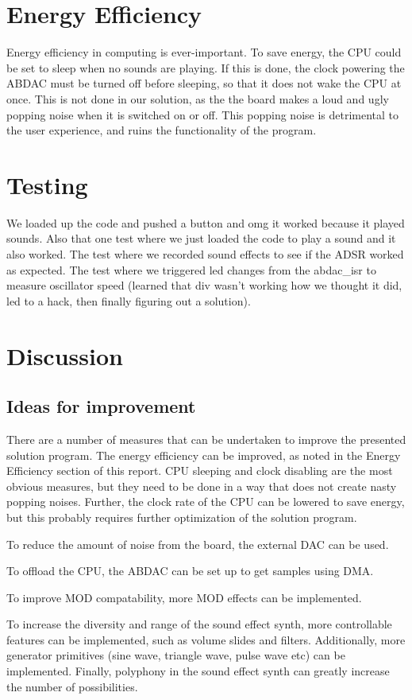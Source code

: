 \section{Energy Efficiency}

Energy efficiency in computing is ever-important.
To save energy, the CPU could be set to sleep when no sounds are playing.
If this is done, the clock powering the ABDAC must be turned off before sleeping, so that it does not wake the CPU at once.
This is not done in our solution, as the the board makes a loud and ugly popping noise when it is switched on or off.
This popping noise is detrimental to the user experience, and ruins the functionality of the program.


\section{Testing}
We loaded up the code and pushed a button and omg it worked because it played sounds.
Also that one test where we just loaded the code to play a sound and it also worked.
The test where we recorded sound effects to see if the ADSR worked as expected.
The test where we triggered led changes from the abdac\_isr to measure oscillator speed (learned that div wasn't working how we thought it did, led to a hack, then finally figuring out a solution).


\section{Discussion}



\subsection{Ideas for improvement}

There are a number of measures that can be undertaken to improve the presented solution program.
The energy efficiency can be improved, as noted in the Energy Efficiency section of this report.
CPU sleeping and clock disabling are the most obvious measures, but they need to be done in a way that does not create nasty popping noises. 
Further, the clock rate of the CPU can be lowered to save energy, but this probably requires further optimization of the solution program.

To reduce the amount of noise from the board, the external DAC can be used.

To offload the CPU, the ABDAC can be set up to get samples using DMA.

To improve MOD compatability, more MOD effects can be implemented.

To increase the diversity and range of the sound effect synth, more controllable features can be implemented, such as volume slides and filters.
Additionally, more generator primitives (sine wave, triangle wave, pulse wave etc) can be implemented.
Finally, polyphony in the sound effect synth can greatly increase the number of possibilities.
